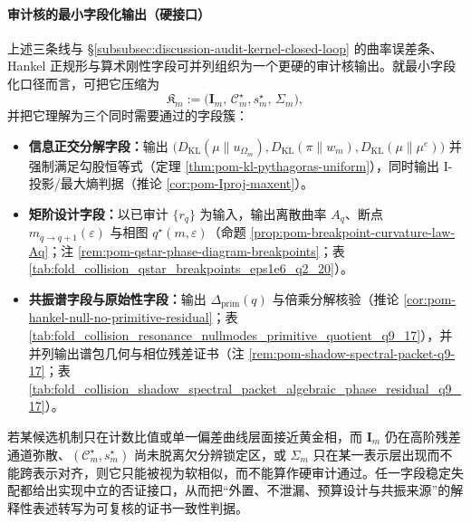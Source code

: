 \paragraph{审计核的最小字段化输出（硬接口）}
上述三条线与 \S\ref{subsubsec:discussion-audit-kernel-closed-loop} 的曲率误差条、Hankel 正规形与算术刚性字段可并列组织为一个更硬的审计核输出。就最小字段化口径而言，可把它压缩为
\[
\mathfrak K_m
:=
\bigl(
\mathbf I_m,\,
\mathcal C_m^\star,s_m^\star,\,
\Sigma_m
\bigr),
\]
并把它理解为三个同时需要通过的字段簇：
\begin{itemize}
  \item \textbf{信息正交分解字段：}输出 \(\bigl(D_{\mathrm{KL}}(\mu\|u_{\Omega_m}),D_{\mathrm{KL}}(\pi\|w_m),D_{\mathrm{KL}}(\mu\|\mu^e)\bigr)\) 并强制满足勾股恒等式（定理 \ref{thm:pom-kl-pythagoras-uniform}），同时输出 I-投影/最大熵判据（推论 \ref{cor:pom-Iproj-maxent}）。
  \item \textbf{矩阶设计字段：}以已审计 \(\{r_q\}\) 为输入，输出离散曲率 \(A_q\)、断点 \(m_{q\to q+1}(\varepsilon)\) 与相图 \(q^\star(m,\varepsilon)\)（命题 \ref{prop:pom-breakpoint-curvature-law-Aq}；注 \ref{rem:pom-qstar-phase-diagram-breakpoints}；表 \ref{tab:fold_collision_qstar_breakpoints_eps1e6_q2_20}）。
  \item \textbf{共振谱字段与原始性字段：}输出 \(\Delta_{\mathrm{prim}}(q)\) 与倍乘分解核验（推论 \ref{cor:pom-hankel-null-no-primitive-residual}；表 \ref{tab:fold_collision_resonance_nullmodes_primitive_quotient_q9_17}），并并列输出谱包几何与相位残差证书（注 \ref{rem:pom-shadow-spectral-packet-q9-17}；表 \ref{tab:fold_collision_shadow_spectral_packet_algebraic_phase_residual_q9_17}）。
\end{itemize}
若某候选机制只在计数比值或单一偏差曲线层面接近黄金相，而 \(\mathbf I_m\) 仍在高阶残差通道弥散、\((\mathcal C_m^\star,s_m^\star)\) 尚未脱离欠分辨锁定区，或 \(\Sigma_m\) 只在某一表示层出现而不能跨表示对齐，则它只能被视为软相似，而不能算作硬审计通过。任一字段稳定失配都给出实现中立的否证接口，从而把“外置、不泄漏、预算设计与共振来源”的解释性表述转写为可复核的证书一致性判据。
